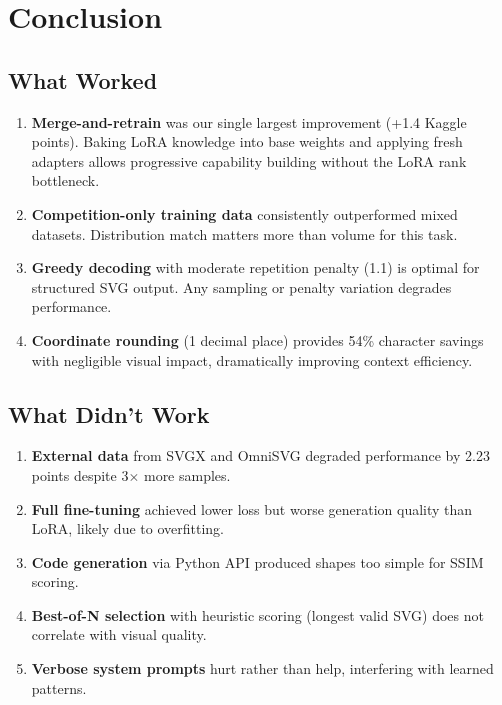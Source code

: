 \documentclass[11pt]{article}
\begin{document}
\section{Conclusion}

\subsection{What Worked}

\begin{enumerate}
    \item \textbf{Merge-and-retrain} was our single largest improvement (+1.4 Kaggle points). Baking LoRA knowledge into base weights and applying fresh adapters allows progressive capability building without the LoRA rank bottleneck.
    \item \textbf{Competition-only training data} consistently outperformed mixed datasets. Distribution match matters more than volume for this task.
    \item \textbf{Greedy decoding} with moderate repetition penalty (1.1) is optimal for structured SVG output. Any sampling or penalty variation degrades performance.
    \item \textbf{Coordinate rounding} (1 decimal place) provides 54\% character savings with negligible visual impact, dramatically improving context efficiency.
\end{enumerate}

\subsection{What Didn't Work}

\begin{enumerate}
    \item \textbf{External data} from SVGX and OmniSVG degraded performance by 2.23 points despite 3$\times$ more samples.
    \item \textbf{Full fine-tuning} achieved lower loss but worse generation quality than LoRA, likely due to overfitting.
    \item \textbf{Code generation} via Python API produced shapes too simple for SSIM scoring.
    \item \textbf{Best-of-N selection} with heuristic scoring (longest valid SVG) does not correlate with visual quality.
    \item \textbf{Verbose system prompts} hurt rather than help, interfering with learned patterns.
\end{enumerate}
\end{document}
